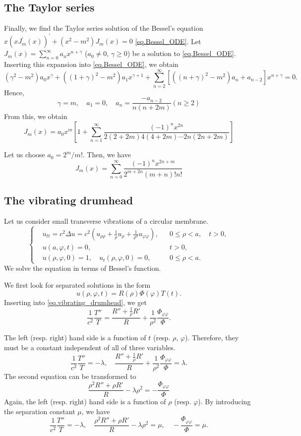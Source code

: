 \subsection{The Taylor series}

Finally, we find the Taylor series solution of the Bessel's equation $x(x J_m^{\prime}(x))^{\prime} + (x^2 - m^2) J_m(x) = 0$ \eqref{eq.Bessel_ODE}. Let $J_m(x)=\sum_{n=0}^{\infty} a_n x^{n+\gamma}$ ($a_0 \neq 0$, $\gamma \geq 0$) be a solution to \eqref{eq.Bessel_ODE}. Inserting this expansion into \eqref{eq.Bessel_ODE}, we obtain
$$
\left(\gamma^2-m^2\right) a_0 x^\gamma+\left((1+\gamma)^2-m^2\right) a_1 x^{\gamma+1}+\sum_{n=2}^{\infty}\left[\left((n+\gamma)^2-m^2\right) a_n+a_{n-2}\right] x^{n+\gamma}=0 .
$$
Hence,
$$
\gamma=m, \quad a_1=0, \quad a_n=\frac{-a_{n-2}}{n(n+2 m)}(n \geq 2)
$$
From this, we obtain
$$
J_m(x)=a_0 x^m\left[1+\sum_{n=1}^{\infty} \frac{(-1)^n x^{2 n}}{2(2+2 m) 4(4+2 m) \cdots 2 n(2 n+2 m)}\right]
$$

Let us choose $a_0=2^m / m!$. Then, we have
$$
J_m(x)=\sum_{n=0}^{\infty} \frac{(-1)^n x^{2 n+m}}{2^{m+2 n}(m+n)!n!}
$$


\subsection{The vibrating drumhead}

Let us consider small transverse vibrations of a circular membrane.
\begin{equation}\label{eq.vibrating_drumhead}
\left\{\begin{aligned}
    &u_{tt}=c^2 \Delta u=c^2\left(u_{\rho \rho}+\frac{1}{\rho} u_\rho+\frac{1}{\rho^2} u_{\varphi \varphi}\right), && 0 \leq \rho<a, \quad t>0, 
    \\
    &u(a, \varphi, t)=0, && t>0, 
    \\
    &u(\rho, \varphi, 0)=1, \quad u_t(\rho, \varphi, 0)=0, && 0 \leq \rho<a .
\end{aligned}\right.
\end{equation}
We solve the equation in terms of Bessel's function.

We first look for separated solutions in the form
$$
u(\rho, \varphi, t)=R(\rho) \Phi(\varphi) T(t).
$$
Inserting into \eqref{eq.vibrating_drumhead}, we get
\[
    \frac{1}{c^2}\frac{T''}{T} = \frac{R''+\frac{1}{\rho} R'}{R} + \frac{1}{\rho^2}\frac{\Phi_{\varphi \varphi}}{\Phi}.
\]

The left (resp. right) hand side is a function of $t$ (resp. $\rho$, $\varphi$). Therefore, they must be a constant independent of all of three variables.
\[
    \frac{1}{c^2}\frac{T''}{T} = -\lambda,\quad \frac{R''+\frac{1}{\rho} R'}{R} + \frac{1}{\rho^2}\frac{\Phi_{\varphi \varphi}}{\Phi} = \lambda.
\]
The second equation can be transformed to 
\[
    \frac{\rho^2 R'' + \rho R'}{R} - \lambda \rho^2 = - \frac{\Phi_{\varphi \varphi}}{\Phi}
\]
Again, the left (resp. right) hand side is a function of $\rho$ (resp. $\varphi$). By introducing the separation constant $\mu$, we have
\[
    \frac{1}{c^2}\frac{T''}{T} = -\lambda,\quad \frac{\rho^2 R'' + \rho R'}{R} - \lambda \rho^2 = \mu, \quad - \frac{\Phi_{\varphi \varphi}}{\Phi} = \mu.
\]

